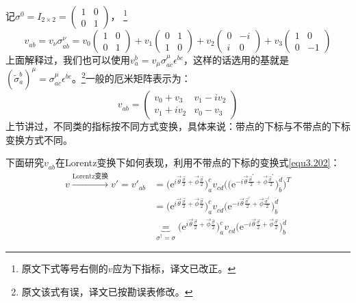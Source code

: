 记$\sigma^0 = I_{2 \times 2} = \begin{pmatrix} 1 & 0 \\ 0 & 1 \end{pmatrix}$， \footnote{原文下式等号右侧的$v$应为下指标，译文已改正。}
\begin{equation}
\label{equ3.215}
	v_{a\dot{b}} = v_\nu \sigma^\nu_{a\dot{b}} = v_0 \begin{pmatrix} 1 & 0 \\ 0 & 1 \end{pmatrix} + v_1 \begin{pmatrix} 0 & 1 \\ 1 & 0 \end{pmatrix} + v_2 \begin{pmatrix} 0 & -i \\ i & 0 \end{pmatrix} + v_3 \begin{pmatrix} 1 & 0 \\ 0 & -1 \end{pmatrix}
\end{equation}
上面解释过，我们也可以使用$v^{\dot{b}}_a = v_\mu \sigma_{a \dot{c}}^\mu \epsilon^{\dot{bc}}$，这样的话选用的基就是$(\tilde{\sigma}^{\dot{b}}_a)^\mu = \sigma_{a \dot{c}}^\mu \epsilon^{\dot{bc}}$。\footnote{原文该式有误，译文已按勘误表修改。}一般的厄米矩阵表示为：
\begin{equation}
\label{equ3.216}
	v_{a\dot{b}} =
		\begin{pmatrix}
			v_0 + v_3 & v_1 - i v_2 \\
			v_1 + i v_2 & v_0 - v_3
		\end{pmatrix}
\end{equation}
上节讲过，不同类的指标按不同方式变换，具体来说：带点的下标与不带点的下标变换方式不同。

下面研究$v_{a\dot{b}}$在Lorentz变换下如何表现，利用不带点的下标的变换式\eqref{equ3.202}：
\begin{align}
	v \stackrel{\text{Lorentz变换}}{\longrightarrow} v' = v'_{a \dot{b}} &= \Big( \mathrm{e}^{ i \vec{\theta} \frac{ \vec{\sigma} }{2} + \vec{\phi} \frac{\vec{\sigma}}{2} } \Big)^c_a v_{c \dot{d}} \Bigg( \Big( \mathrm{e}^{ -i \vec{\theta} \frac{ \vec{\sigma}^* }{2} + \vec{\phi} \frac{ \vec{\sigma}^* }{2} } \Big)^{\dot{d}}_{\dot{b}} \Bigg)^T \nonumber \\
	&= \Big( \mathrm{e}^{ i \vec{\theta} \frac{ \vec{\sigma} }{2}  + \vec{\phi} \frac{\vec{\sigma}}{2}} \Big)^c_a v_{c \dot{d}} \bigg( \mathrm{e}^{ -i\vec{\theta} \frac{ \vec{\sigma}^\dag }{2} + \vec{\phi} \frac{ \vec{\sigma}^\dag }{2} } \bigg)^{\dot{d}}_{\dot{b}} \nonumber \\
\label{equ3.217}
	& \underbrace{=}_{\sigma^\dag = \sigma} \Big( \mathrm{e}^{ i \vec{\theta} \frac{ \vec{\sigma} }{2}  + \vec{\phi} \frac{\vec{\sigma}}{2}} \Big)^c_a v_{c \dot{d}} \Big(  \mathrm{e}^{ -i\vec{\theta} \frac{ \vec{\sigma} }{2} + \vec{\phi} \frac{ \vec{\sigma} }{2} } \Big)^{\dot{d}}_{\dot{b}}
\end{align}

